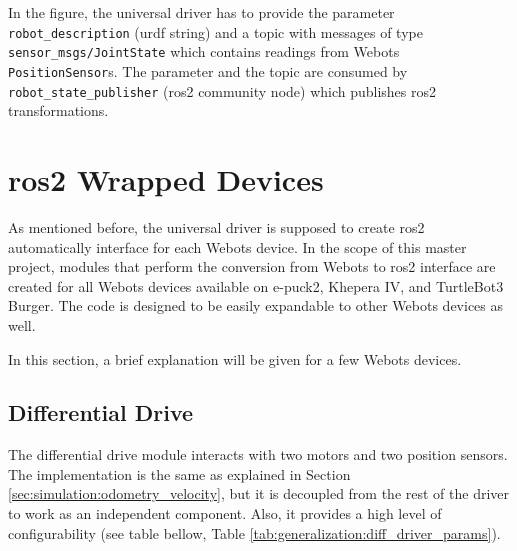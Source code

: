 In the figure, the universal driver has to provide the parameter \texttt{robot\_description} (\ac{urdf} string) and a topic with messages of type \texttt{sensor\_msgs/JointState} which contains readings from Webots \texttt{PositionSensor}s.
The parameter and the topic are consumed by \texttt{robot\_state\_publisher} (\ac{ros2} community node) which publishes \ac{ros2} transformations.

\section{\ac{ros2} Wrapped Devices}
As mentioned before, the universal driver is supposed to create \ac{ros2} automatically interface for each Webots device.
In the scope of this master project, modules that perform the conversion from Webots to \ac{ros2} interface are created for all Webots devices available on e-puck2, Khepera IV, and TurtleBot3 Burger.
The code is designed to be easily expandable to other Webots devices as well.

In this section, a brief explanation will be given for a few Webots devices.

\subsection{Differential Drive}
The differential drive module interacts with two motors and two position sensors.
The implementation is the same as explained in Section \ref{sec:simulation:odometry_velocity}, but it is decoupled from the rest of the driver to work as an independent component.
Also, it provides a high level of configurability (see table bellow, Table \ref{tab:generalization:diff_driver_params}).

